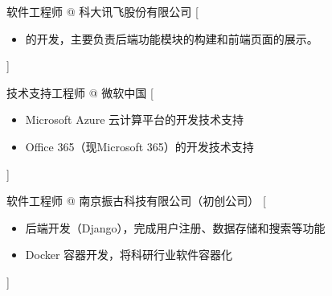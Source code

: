 \documentclass[zh]{resume}
\begin{document}
\begin{experiences}
    {软件工程师 @ 科大讯飞股份有限公司}%
    [\begin{itemize}
      \item {}的开发，主要负责后端功能模块的构建和前端页面的展示。
    \end{itemize}]

  \separator{0.5ex}
    {技术支持工程师 @ \icon{\faMicrosoft}微软中国}%
    [\begin{itemize}
      \item Microsoft Azure 云计算平台的开发技术支持
      \item Office 365（现Microsoft 365）的开发技术支持
    \end{itemize}]
  
  \separator{0.5ex}
    {软件工程师 @ 南京振古科技有限公司（初创公司）}%
    [\begin{itemize}
      \item 后端开发（Django），完成用户注册、数据存储和搜索等功能
      \item Docker 容器开发，将科研行业软件容器化
    \end{itemize}]
  
\end{experiences}
\end{document}
